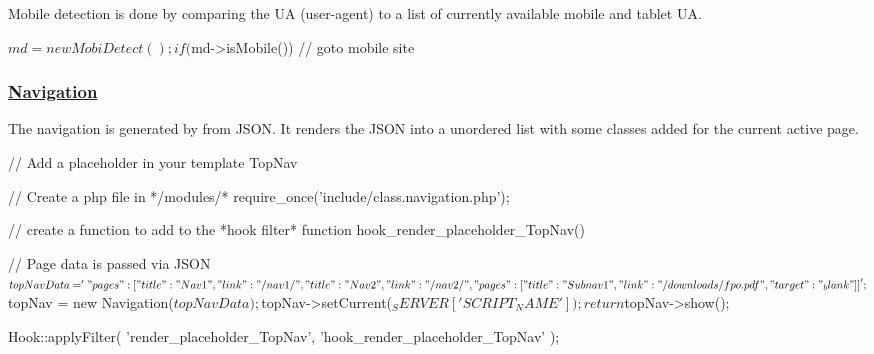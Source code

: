 Mobile detection is done by comparing the U\-A (user-\/agent) to a list of currently available mobile and tablet U\-A. \begin{DoxyVerb}$md = new MobiDetect();

if ($md->isMobile()) {
    // goto mobile site
}
\end{DoxyVerb}


\subsubsection*{\hyperlink{class_navigation}{Navigation}}

The navigation is generated by from J\-S\-O\-N. It renders the J\-S\-O\-N into a unordered list with some classes added for the current active page. \begin{DoxyVerb}// Add a placeholder in your template
{{ TopNav }}

// Create a php file in */modules/*
require_once('include/class.navigation.php');

// create a function to add to the *hook filter*
function hook_render_placeholder_TopNav() {

    // Page data is passed via JSON
    $topNavData = '{
        "pages": [
            {
                "title": "Nav 1",
                "link": "/nav1/"
            }, {
                "title": "Nav 2",
                "link": "/nav2/",
                "pages": [
                    {
                        "title": "Subnav 1",
                        "link": "/downloads/fpo.pdf",
                        "target": "_blank"
                    }
                ]
            }
        ]
    }';

    $topNav = new Navigation($topNavData);
    $topNav->setCurrent($_SERVER['SCRIPT_NAME']);

    return $topNav->show();
}

Hook::applyFilter(
    'render_placeholder_TopNav',
    'hook_render_placeholder_TopNav'
);\end{DoxyVerb}
 